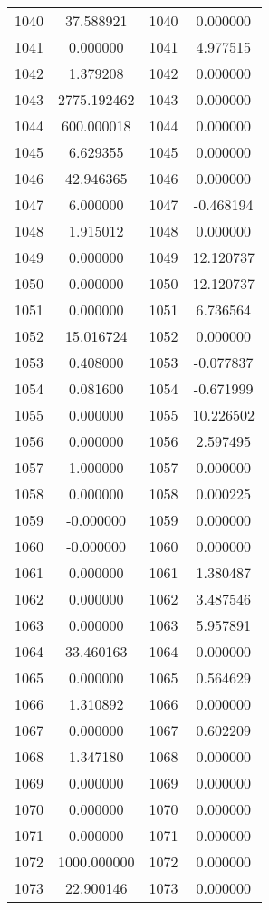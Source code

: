 \documentclass[12pt]{article}
\begin{document}
\begin{longtable}{@{}cccc@{}}
1040 & 37.588921 & 1040 & 0.000000 \\
1041 & 0.000000 & 1041 & 4.977515 \\
1042 & 1.379208 & 1042 & 0.000000 \\
1043 & 2775.192462 & 1043 & 0.000000 \\
1044 & 600.000018 & 1044 & 0.000000 \\
1045 & 6.629355 & 1045 & 0.000000 \\
1046 & 42.946365 & 1046 & 0.000000 \\
1047 & 6.000000 & 1047 & -0.468194 \\
1048 & 1.915012 & 1048 & 0.000000 \\
1049 & 0.000000 & 1049 & 12.120737 \\
1050 & 0.000000 & 1050 & 12.120737 \\
1051 & 0.000000 & 1051 & 6.736564 \\
1052 & 15.016724 & 1052 & 0.000000 \\
1053 & 0.408000 & 1053 & -0.077837 \\
1054 & 0.081600 & 1054 & -0.671999 \\
1055 & 0.000000 & 1055 & 10.226502 \\
1056 & 0.000000 & 1056 & 2.597495 \\
1057 & 1.000000 & 1057 & 0.000000 \\
1058 & 0.000000 & 1058 & 0.000225 \\
1059 & -0.000000 & 1059 & 0.000000 \\
1060 & -0.000000 & 1060 & 0.000000 \\
1061 & 0.000000 & 1061 & 1.380487 \\
1062 & 0.000000 & 1062 & 3.487546 \\
1063 & 0.000000 & 1063 & 5.957891 \\
1064 & 33.460163 & 1064 & 0.000000 \\
1065 & 0.000000 & 1065 & 0.564629 \\
1066 & 1.310892 & 1066 & 0.000000 \\
1067 & 0.000000 & 1067 & 0.602209 \\
1068 & 1.347180 & 1068 & 0.000000 \\
1069 & 0.000000 & 1069 & 0.000000 \\
1070 & 0.000000 & 1070 & 0.000000 \\
1071 & 0.000000 & 1071 & 0.000000 \\
1072 & 1000.000000 & 1072 & 0.000000 \\
1073 & 22.900146 & 1073 & 0.000000 \\

\end{longtable}
\end{document}
